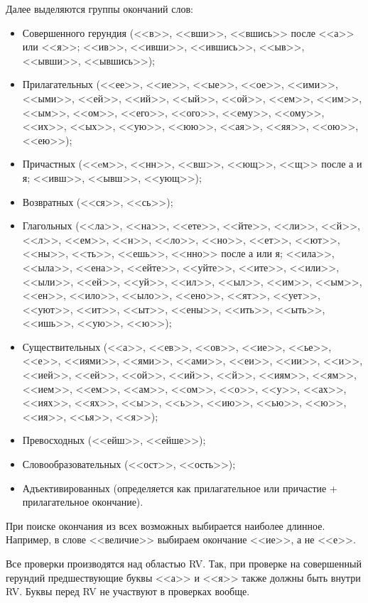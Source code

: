 Далее выделяются группы окончаний слов:
\begin{itemize}
    \item Совершенного герундия (<<в>>, <<вши>>, <<вшись>> после <<а>> или <<я>>; <<ив>>, <<ивши>>, <<ившись>>, <<ыв>>, <<ывши>>, <<ывшись>>);
    \item Прилагательных (<<ее>>, <<ие>>, <<ые>>, <<ое>>, <<ими>>, <<ыми>>, <<ей>>, <<ий>>, <<ый>>, <<ой>>, <<ем>>, <<им>>, <<ым>>, <<ом>>, <<его>>, <<ого>>, <<ему>>, <<ому>>, <<их>>, <<ых>>, <<ую>>, <<юю>>, <<ая>>, <<яя>>, <<ою>>, <<ею>>);
    \item Причастных (<<eм>>, <<нн>>, <<вш>>, <<ющ>>, <<щ>> после а и я; <<ивш>>, <<ывш>>, <<ующ>>);
    \item Возвратных (<<ся>>, <<сь>>);
    \item Глагольных (<<ла>>, <<на>>, <<ете>>, <<йте>>, <<ли>>, <<й>>, <<л>>, <<ем>>, <<н>>, <<ло>>, <<но>>, <<ет>>, <<ют>>, <<ны>>, <<ть>>, <<ешь>>, <<нно>> после а или я; <<ила>>, <<ыла>>, <<ена>>, <<ейте>>, <<уйте>>, <<ите>>, <<или>>, <<ыли>>, <<ей>>, <<уй>>, <<ил>>, <<ыл>>, <<им>>, <<ым>>, <<ен>>, <<ило>>, <<ыло>>, <<ено>>, <<ят>>, <<ует>>, <<уют>>, <<ит>>, <<ыт>>, <<ены>>, <<ить>>, <<ыть>>, <<ишь>>, <<ую>>, <<ю>>);
    \item Существительных (<<а>>, <<ев>>, <<ов>>, <<ие>>, <<ье>>, <<е>>, <<иями>>, <<ями>>, <<ами>>, <<еи>>, <<ии>>, <<и>>, <<ией>>, <<ей>>, <<ой>>, <<ий>>, <<й>>, <<иям>>, <<ям>>, <<ием>>, <<ем>>, <<ам>>, <<ом>>, <<о>>, <<у>>, <<ах>>, <<иях>>, <<ях>>, <<ы>>, <<ь>>, <<ию>>, <<ью>>, <<ю>>, <<ия>>, <<ья>>, <<я>>);
    \item Превосходных (<<ейш>>, <<ейше>>);
    \item Словообразовательных (<<ост>>, <<ость>>);
    \item Адъективированных (определяется как прилагательное или причастие + прилагательное окончание).
\end{itemize}

При поиске окончания из всех возможных выбирается наиболее длинное. Например, в слове <<величие>> выбираем окончание <<ие>>, а не <<е>>.

Все проверки производятся над областью RV. Так, при проверке на совершенный герундий предшествующие буквы <<а>> и <<я>> также должны быть внутри RV. Буквы перед RV не участвуют в проверках вообще.

